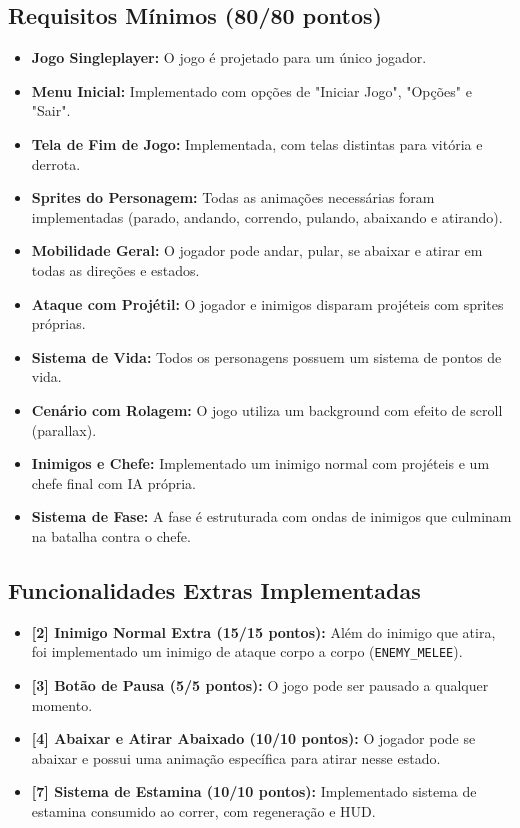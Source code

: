 \documentclass[11pt, a4paper]{article}
\begin{document}
\subsection{Requisitos Mínimos (80/80 pontos)}
\begin{itemize}
    \item[\checkmark] \textbf{Jogo Singleplayer:} O jogo é projetado para um único jogador.
    \item[\checkmark] \textbf{Menu Inicial:} Implementado com opções de "Iniciar Jogo", "Opções" e "Sair".
    \item[\checkmark] \textbf{Tela de Fim de Jogo:} Implementada, com telas distintas para vitória e derrota.
    \item[\checkmark] \textbf{Sprites do Personagem:} Todas as animações necessárias foram implementadas (parado, andando, correndo, pulando, abaixando e atirando).
    \item[\checkmark] \textbf{Mobilidade Geral:} O jogador pode andar, pular, se abaixar e atirar em todas as direções e estados.
    \item[\checkmark] \textbf{Ataque com Projétil:} O jogador e inimigos disparam projéteis com sprites próprias.
    \item[\checkmark] \textbf{Sistema de Vida:} Todos os personagens possuem um sistema de pontos de vida.
    \item[\checkmark] \textbf{Cenário com Rolagem:} O jogo utiliza um background com efeito de scroll (parallax).
    \item[\checkmark] \textbf{Inimigos e Chefe:} Implementado um inimigo normal com projéteis e um chefe final com IA própria.
    \item[\checkmark] \textbf{Sistema de Fase:} A fase é estruturada com ondas de inimigos que culminam na batalha contra o chefe.
\end{itemize}

\subsection{Funcionalidades Extras Implementadas}
\begin{itemize}
    \item[\checkmark] \textbf{[2] Inimigo Normal Extra (15/15 pontos):} Além do inimigo que atira, foi implementado um inimigo de ataque corpo a corpo (\texttt{ENEMY\_MELEE}).
    \item[\checkmark] \textbf{[3] Botão de Pausa (5/5 pontos):} O jogo pode ser pausado a qualquer momento.
    \item[\checkmark] \textbf{[4] Abaixar e Atirar Abaixado (10/10 pontos):} O jogador pode se abaixar e possui uma animação específica para atirar nesse estado.
    \item[\checkmark] \textbf{[7] Sistema de Estamina (10/10 pontos):} Implementado sistema de estamina consumido ao correr, com regeneração e HUD.
\end{itemize}
\end{document}
